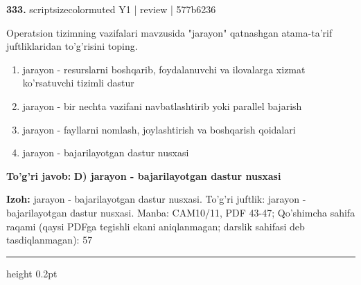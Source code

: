 \documentclass[10pt,a4paper]{article}
\begin{document}
{\bfseries\sffamily\color{ink} 333.} {scriptsizecolor{muted} Y1 | review | 577b6236}
\par
Operatsion tizimning vazifalari mavzusida "jarayon" qatnashgan atama-ta'rif juftliklaridan to'g'risini toping.
\begin{enumerate}[label=\Alph*),leftmargin=9mm]
\item jarayon - resurslarni boshqarib, foydalanuvchi va ilovalarga xizmat ko'rsatuvchi tizimli dastur
\item jarayon - bir nechta vazifani navbatlashtirib yoki parallel bajarish
\item jarayon - fayllarni nomlash, joylashtirish va boshqarish qoidalari
\item jarayon - bajarilayotgan dastur nusxasi
\end{enumerate}
\begin{tcolorbox}[enhanced,breakable,colback=teal!4,colframe=teal!60!black,boxrule=0.45pt,arc=1.2mm,left=2.7mm,right=2.7mm,top=1.8mm,bottom=1.8mm,before skip=2mm,after skip=2mm]
{\bfseries\sffamily\color{teal}To'g'ri javob:} \textbf{D) jarayon - bajarilayotgan dastur nusxasi}
\par\smallskip
{\bfseries Izoh:} jarayon - bajarilayotgan dastur nusxasi. To'g'ri juftlik: jarayon - bajarilayotgan dastur nusxasi. Manba: CAM10/11, PDF 43-47; Qo'shimcha sahifa raqami (qaysi PDFga tegishli ekani aniqlanmagan; darslik sahifasi deb tasdiqlanmagan): 57
\end{tcolorbox}
\vspace{2mm}\hrule height 0.2pt\vspace{3mm}
\end{document}
